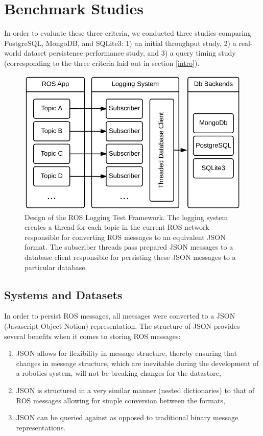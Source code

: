 \documentclass[nocopyrightspace]{acm_proc_article-sp}
\begin{document}
\section{Benchmark Studies}
In order to evaluate these three criteria, we conducted three studies comparing PostgreSQL, MongoDB, and SQLite3: 1) an initial throughput study, 2) a real-world dataset persistence performance study, and 3) a query timing study (corresponding to the three criteria laid out in section \ref{intro}).

\begin{figure}
    \centering
    \includegraphics[width=\linewidth]{images/roslog}
    \caption{Design of the ROS Logging Test Framework. The logging system creates a thread for each topic in the current ROS network responsible for converting ROS messages to an equivalent JSON format. The subscriber threads pass prepared JSON messages to a database client responsible for persisting these JSON messages to a particular database.}
    \label{fig:roslog}
\end{figure}

\subsection{Systems and Datasets}
\label{sec:datasets}
In order to persist ROS messages, all messages were converted to a JSON (Javascript Object Notion) representation. The structure of JSON provides several benefits when it comes to storing ROS messages:
\begin{enumerate}
\item JSON allows for flexibility in message structure, thereby ensuring that changes in message structure, which are inevitable during the development of a robotics system, will not be breaking changes for the datastore,
\item JSON is structured in a very similar manner (nested dictionaries) to that of ROS messages allowing for simple conversion between the formats,
\item JSON can be queried against as opposed to traditional binary message representations.
\end{enumerate}
\end{document}
